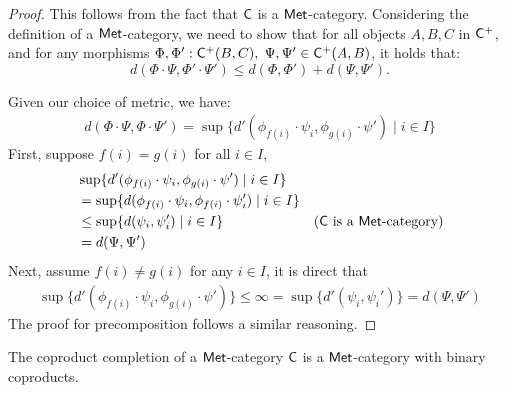 \begin{proof}
  This follows from the fact that $\mathsf{C}$ is a $\mathsf{Met}$-category. Considering the definition of a $\mathsf{Met}$-category, we need to show that for all objects $A, B,C$ in $\mathsf{C}^+$, and for any morphisms $\Phi,\Phi':\mathsf{C}^+(B, C),$  $\Psi, \Psi' \in \mathsf{C}^+(A, B)$, it holds that:
  \[d(\Phi \cdot \Psi, \Phi' \cdot \Psi') \leq d(\Phi, \Phi') + d(\Psi, \Psi').\]

  Given our choice of metric, we have:
  \begin{align*}
    d(\Phi \cdot \Psi, \Phi \cdot \Psi') = \sup \{d'(\phi_{f(i)} \cdot \psi_i, \phi_{g(i)} \cdot \psi')  \;\vert\; i \in I \}
  \end{align*}
  First, suppose $f(i)=g(i)$ for all $i \in I$,
  \begin{align*}
   & \sup \{d'(\phi_{f(i)} \cdot \psi_i, \phi_{g(i)} \cdot \psi')  \;\vert\; i \in I \} \\
   &= \sup \{d(\phi_{f(i)} \cdot \psi_i,\phi_{f(i)} \cdot \psi_i' ) \;\vert\; i \in I\}\\
      &  \leq \sup \{d( \psi_i, \psi_i' ) \;\vert\; i \in I\} & (\mathsf{C} \text{ is a $\mathsf{Met}$-category}) \\
      & = d(\Psi, \Psi')
  \end{align*}
  Next, assume $f(i)\neq g(i)$ for any $i \in I$, it is direct that 
  \begin{align*}
   \sup \{d'(\phi_{f(i)} \cdot \psi_i, \phi_{g(i)} \cdot \psi') \} \leq \infty = \sup \{d'(\psi_i, \psi_i') \} = d(\Psi, \Psi')
  \end{align*}
  The proof for precomposition follows a similar reasoning.
\end{proof}


  \begin{proposition}
  The coproduct completion of a $\mathsf{Met}$-category $\mathsf{C}$ is a  $\mathsf{Met}$-category with binary coproducts.
\end{proposition}


